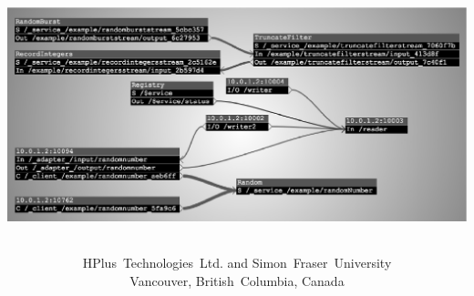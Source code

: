 \documentclass[letterpaper,titlepage,twoside]{report}
\title{\cal\Huge\textitcorr{Movement~and~Meaning~Middleware}\\
\vspace{1ex}
\begin{center}\includegraphics{ChannelManager.eps}\end{center}}
\author{HPlus~Technologies~Ltd. and Simon~Fraser~University\\
Vancouver, British~Columbia, Canada}
\newcommand{\mymark}{}
\newcommand*{\insertpart}[2]{\clearpage\renewcommand{\mymark}{#1}#2}
\renewcommand{\mymark}{#4}%
\begin{document}

\maketitle

\insertpart{Contents}{\tableofcontents}
\insertpart{List~of~Figures}{\listoffigures}




\clearpage{}
















\appendix






\insertpart{Index}{\printindex}
\end{document}
